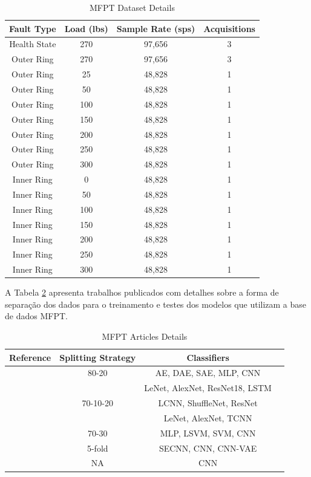 \documentclass[conference]{IEEEtran}
\begin{document}
\begin{table}[htbp]
\caption{MFPT Dataset Details}
\begin{center}
\begin{tabular}{|c|c|c|c|}
\hline
\textbf{Fault Type}&{\textbf{Load (lbs)}}&{\textbf{Sample Rate (sps)}}&\textbf{Acquisitions}\\
\hline
Health State&270&97,656&3\\
Outer Ring&270&97,656&3\\
Outer Ring&25&48,828&1\\
Outer Ring&50&48,828&1\\
Outer Ring&100&48,828&1\\
Outer Ring&150&48,828&1\\
Outer Ring&200&48,828&1\\
Outer Ring&250&48,828&1\\
Outer Ring&300&48,828&1\\
Inner Ring&0&48,828&1\\
Inner Ring&50&48,828&1\\
Inner Ring&100&48,828&1\\
Inner Ring&150&48,828&1\\
Inner Ring&200&48,828&1\\
Inner Ring&250&48,828&1\\
Inner Ring&300&48,828&1\\
\hline
\end{tabular}
\label{tab1}
\end{center}
\end{table}

A Tabela \ref{tab2} apresenta trabalhos publicados com detalhes sobre a forma de separação dos dados para o treinamento e testes dos modelos que utilizam a base de dados MFPT.

\begin{table}[htbp]
\caption{MFPT Articles Details}
\begin{center}
\begin{tabular}{|c|c|c|c|}
\hline
\textbf{Reference}&{\textbf{Splitting Strategy}}&{\textbf{Classifiers}}\\
\hline
\cite{b5}&80-20&AE, DAE, SAE, MLP, CNN\\
&&LeNet, AlexNet, ResNet18, LSTM\\
\cite{b6}&70-10-20&LCNN, ShuffleNet, ResNet\\
&&LeNet, AlexNet, TCNN\\
\cite{b7}&70-30&MLP, LSVM, SVM, CNN\\
\cite{b8}&5-fold&SECNN, CNN, CNN-VAE\\
\cite{b9}&NA&CNN\\
\hline
\end{tabular}
\label{tab2}
\end{center}
\end{table}
\end{document}
